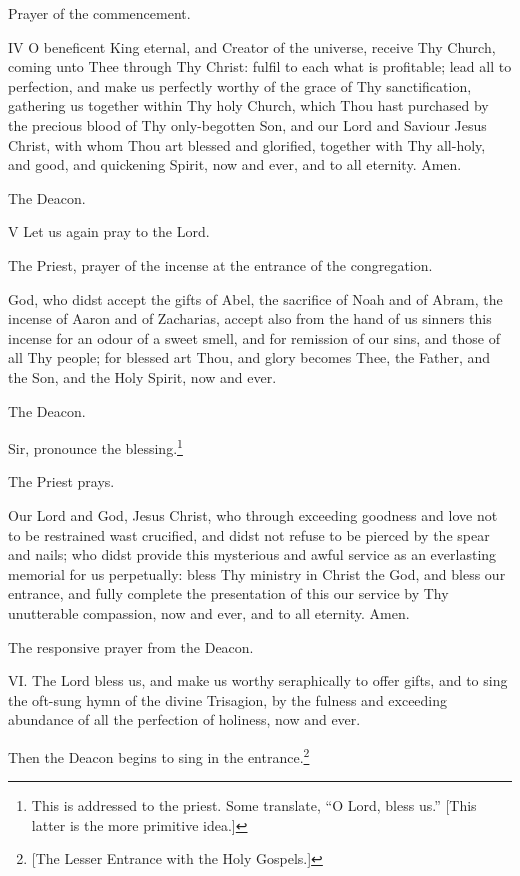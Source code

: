 Prayer of the commencement.

\textsc{IV} O beneficent King eternal, and Creator of the universe, receive Thy Church, coming unto Thee through Thy Christ: fulfil to each what is profitable; lead all to perfection, and make us perfectly worthy of the grace of Thy sanctification, gathering us together within Thy holy Church, which Thou hast purchased by the precious blood of Thy only-begotten Son, and our Lord and Saviour Jesus Christ, with whom Thou art blessed and glorified, together with Thy all-holy, and good, and quickening Spirit, now and ever, and to all eternity. Amen.

The Deacon.

\textsc{V} Let us again pray to the Lord.

The Priest, prayer of the incense at the entrance of the congregation.

God, who didst accept the gifts of Abel, the sacrifice of Noah and of Abram, the incense of Aaron and of Zacharias, accept also from the hand of us sinners this incense for an odour of a sweet smell, and for remission of our sins, and those of all Thy people; for blessed art Thou, and glory becomes Thee, the Father, and the Son, and the Holy Spirit, now and ever.

The Deacon.

Sir, pronounce the blessing.\footnote{\par  This is addressed to the priest. Some translate, “O Lord, bless us.” [This latter is the more primitive idea.]}

The Priest prays.

Our Lord and God, Jesus Christ, who through exceeding goodness and love not to be restrained wast crucified, and didst not refuse to be pierced by the spear and nails; who didst provide this mysterious and awful service as an everlasting memorial for us perpetually: bless Thy ministry in Christ the God, and bless our entrance, and fully complete the presentation of this our service by Thy unutterable compassion, now and ever, and to all eternity. Amen.

The responsive prayer from the Deacon.

\textsc{VI. }The Lord bless us, and make us worthy seraphically to offer gifts, and to sing the oft-sung hymn of the divine Trisagion, by the fulness and exceeding abundance of all the perfection of holiness, now and ever.

Then the Deacon begins to sing in the entrance.\footnote{\par{}  [The Lesser Entrance with the Holy Gospels.]}

